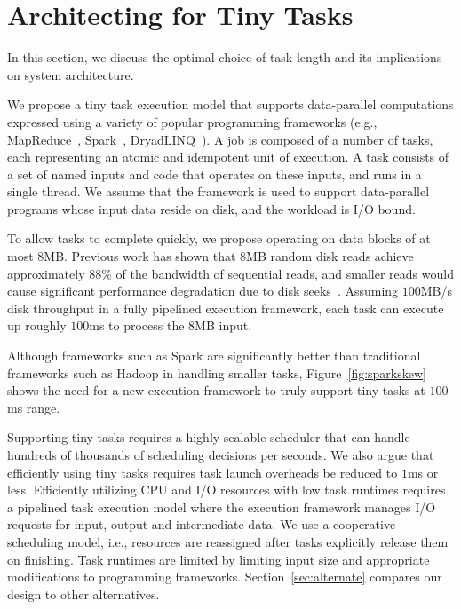 \section{Architecting for Tiny Tasks}
\label{sec:architecture}

In this section, we discuss the optimal choice of task length and its implications
on system architecture.

We propose a tiny task execution model that supports data-parallel computations
expressed using a variety of popular programming frameworks (e.g.,
MapReduce~\cite{dean2008mapreduce}, Spark~\cite{zaharia2010spark},
DryadLINQ~\cite{yu2008dryadlinq}).
A job is composed of a number of tasks, each representing an atomic
and idempotent unit of execution. A task consists of a set of named inputs
and code that operates on these inputs, and runs in a single thread.
We assume that the framework is used to support data-parallel programs whose input
data reside on disk, and the workload is I/O bound.

To allow tasks to complete quickly, we propose operating on data blocks of
at most $8$MB.
Previous work has shown that $8$MB random disk reads achieve
approximately $88$\% of the bandwidth of sequential reads, and smaller reads would
cause significant performance degradation due to disk seeks~\cite{nightingale2012flat}. 
Assuming $100$MB/s disk throughput in a fully pipelined execution framework, each task
can execute up roughly $100$ms to process the $8$MB input.

Although frameworks such as Spark are significantly better
than traditional frameworks such as Hadoop in handling smaller tasks,
Figure~\ref{fig:sparkskew} shows the need for a new execution framework
to truly support tiny tasks at $100$ms range.


Supporting tiny tasks requires a highly scalable scheduler that can handle hundreds 
of thousands of scheduling decisions per seconds. We also argue that efficiently using
tiny tasks requires task launch overheads be reduced to $1$ms or less.
Efficiently utilizing CPU and I/O resources with low task runtimes requires
a pipelined task execution model where the execution framework manages I/O
requests for input, output and intermediate data. We use a cooperative 
scheduling model, i.e., resources are reassigned after tasks explicitly release 
them on finishing. Task runtimes are limited by limiting input size and
appropriate modifications to programming frameworks. Section~\ref{sec:alternate} 
compares our design to other alternatives.



